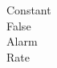 \documentclass[preview]{standalone}
\begin{document}
\begin{center}
\raggedright Constant\\ \vspace{2mm} False\\Alarm\\Rate
\end{center}
\end{document}
